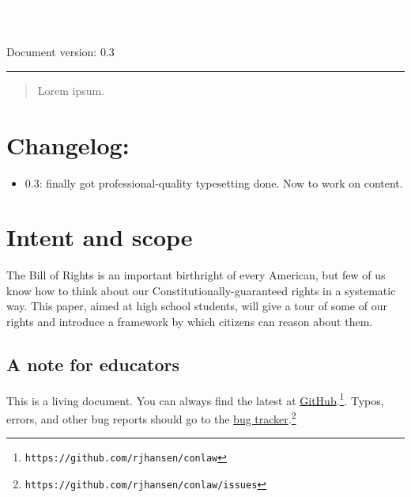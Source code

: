 \documentclass[10pt]{article}
\date{October 13, 2024}
\author{Robert J.~Hansen}
\makeatletter
\def\printauthor{%
    {\large \@author}\\
    Document version: 0.3}
\makeatother
\begin{document}
\begin{titlepage}
\BgThispage
{}
\vspace*{2cm}
\noindent
\textcolor{white}{\bigsf The Bill of Rights}
\vspace*{2.5cm}\par
\noindent
\begin{minipage}{0.35\linewidth}
    \begin{flushright}
        \printauthor
    \end{flushright}
\end{minipage} \hspace{15pt}
%
\begin{minipage}{0.02\linewidth}
    \rule{1pt}{175pt}
\end{minipage} \hspace{-10pt}
%
\begin{minipage}{0.6\linewidth}
\vspace{5pt}
\begin{abstract}
Lorem ipsum.
\end{abstract}
\end{minipage}
\end{titlepage}
\restoregeometry
\thispagestyle{empty}
\clearpage
\section*{Changelog:}
\begin{itemize}
  \item 0.3: finally got professional-quality typesetting done.  Now to work on content.
\end{itemize}
\clearpage
\thispagestyle{empty}
\tableofcontents
\twocolumn
\clearpage\thispagestyle{empty}\mbox{}\clearpage

\setcounter{page}{1}

\section{Intent and scope}
The Bill of Rights is an important birthright of every American, but few of us know how to think about our Constitutionally-guaranteed rights in a systematic way.  This paper, aimed at high school students, will give a tour of some of our rights and introduce a framework by which citizens can reason about them.

\subsection{A note for educators}
This is a living document.  You can always find the latest at \href{https://github.com/rjhansen/conlaw}{GitHub}.\footnote{\tt https://github.com/rjhansen/conlaw}.  Typos, errors, and other bug reports should go to the \href{https://github.com/rjhansen/conlaw/issues}{bug tracker}.\footnote{\tt https://github.com/rjhansen/conlaw/issues}
\end{document}
